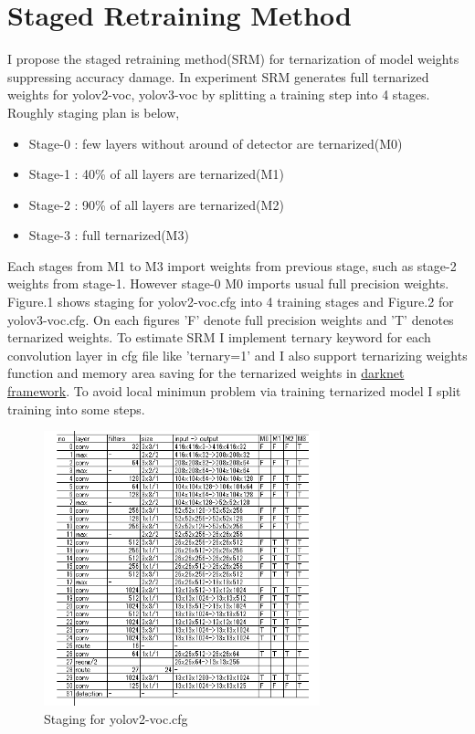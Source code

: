 \documentclass[10pt,a4paper,twocolumn]{article}
\begin{document}
\section{Staged Retraining Method}

I propose the staged retraining method(SRM) for ternarization of model weights suppressing accuracy damage.
In experiment SRM generates full ternarized weights for yolov2-voc\cite{redmon2016yolo9000}, yolov3-voc\cite{yolov3} by splitting a training step into 4 stages.
Roughly staging plan is below,

\begin{itemize}
\item Stage-0 : few layers without around of detector are ternarized(M0)
\item Stage-1 : 40\% of all layers are ternarized(M1)
\item Stage-2 : 90\% of all layers are ternarized(M2)
\item Stage-3 : full ternarized(M3)
\end{itemize}

Each stages from M1 to M3 import weights from previous stage, such as stage-2 weights from stage-1.
However stage-0 M0 imports usual full precision weights.
Figure.1 shows staging for yolov2-voc.cfg into 4 training stages and Figure.2 for yolov3-voc.cfg.
On each figures 'F' denote full precision weights and 'T' denotes ternarized weights.
To estimate SRM I implement ternary keyword for each convolution layer in cfg file like 'ternary=1' and I also support ternarizing weights function and memory area saving for the ternarized weights in \href{https://pjreddie.com/darknet/yolo}{darknet framework}.
To avoid local minimun problem via training ternarized model I split training into some steps.

\begin{figure}
\includegraphics[width=8cm]{yolov2-voc_Stages.png}
\caption{Staging for yolov2-voc.cfg}
\end{figure}
\end{document}
